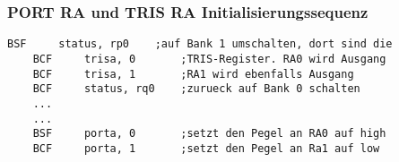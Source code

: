   \subsubsection*{PORT RA und TRIS RA Initialisierungssequenz}
  \begin{lstlisting}[language=avr]
    BSF     status, rp0    ;auf Bank 1 umschalten, dort sind die 
    BCF     trisa, 0       ;TRIS-Register. RA0 wird Ausgang
    BCF     trisa, 1       ;RA1 wird ebenfalls Ausgang
    BCF     status, rq0    ;zurueck auf Bank 0 schalten 
    ... 
    ... 
    BSF     porta, 0       ;setzt den Pegel an RA0 auf high
    BCF     porta, 1       ;setzt den Pegel an Ra1 auf low

    \end{lstlisting}